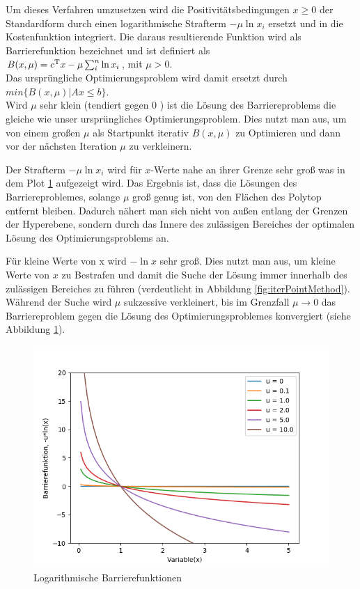 \documentclass{like}
\begin{document}
Um dieses Verfahren umzusetzen wird die Positivitätsbedingungen $x \geq 0$ der Standardform durch einen logarithmische Strafterm $-\mu \ln x_i $  ersetzt und in die Kostenfunktion integriert. Die daraus resultierende Funktion wird als Barrierefunktion bezeichnet und ist definiert als \\
$B(x,\mu) =  c\textsuperscript{T}x - \mu \sum_{i}^{n} \ln x_i$, mit $\mu > 0$. \\
Das ursprüngliche Optimierungsproblem wird damit ersetzt durch 
$min \{B(x,\mu) | Ax \leq b\}$.\\
Wird \(\mu\) sehr klein (tendiert gegen \(0\) ) ist die Lösung des Barriereproblems die gleiche wie unser ursprüngliches Optimierungsproblem. Dies nutzt man aus, um von einem großen \(\mu\) als Startpunkt iterativ $B(x,\mu)$ zu Optimieren und dann vor der nächsten Iteration \(\mu\) zu verkleinern.


Der Strafterm $-\mu \ln x_i $ wird für $x$-Werte nahe an ihrer Grenze sehr groß was in dem Plot \ref{fig:iterPointLn} aufgezeigt wird. Das Ergebnis ist, dass die Lösungen des Barriereproblemes, solange $\mu$ groß genug ist, von den Flächen des Polytop entfernt bleiben.
Dadurch nähert man sich nicht von außen entlang der Grenzen der Hyperebene, sondern durch das Innere des zulässigen Bereiches der optimalen Lösung des Optimierungsproblems an. 

Für kleine Werte von x wird $-\ln x $ sehr groß. Dies nutzt man aus, um kleine Werte von \(x\) zu Bestrafen und damit die Suche der Lösung immer innerhalb des zulässigen Bereiches zu führen (verdeutlicht in Abbildung \ref{fig:iterPointMethod}). Während der Suche wird \(\mu\) sukzessive verkleinert, bis im Grenzfall $ \mu \rightarrow 0$ das Barriereproblem gegen die Lösung des Optimierungsproblemes konvergiert (siehe Abbildung \ref{fig:iterPointLn}).\\

\begin{figure}[ht!]
	\centering
	\includegraphics[width=350pt]{Abbildungen/intPointLn.png}
	\caption{Logarithmische Barrierefunktionen}
	\label{fig:iterPointLn}
\end{figure}
\end{document}
